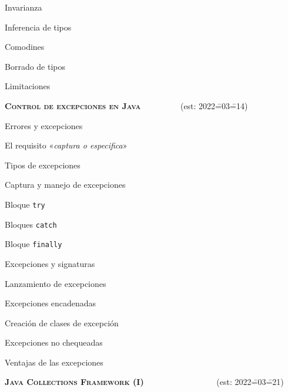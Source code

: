 \begin{longenum}
\begin{longenum}
\begin{longenum}
\begin{longenum}
                \item Invarianza
            \end{longenum}
        \end{longenum}
        \item Inferencia de tipos
        \item Comodines
        \item Borrado de tipos
        \item Limitaciones
    \end{longenum}
    \item \textbf{\textsc{Control de excepciones en Java}} \ \ \ \ \ \ \ \ \ (est: 2022\==03\==14)
    \begin{longenum}
        \item Errores y excepciones
        \item El requisito «\textit{captura o especifica}»
        \begin{longenum}
            \item Tipos de excepciones
        \end{longenum}
        \item Captura y manejo de excepciones
        \begin{longenum}
            \item Bloque \texttt{try}
            \item Bloques \texttt{catch}
            \item Bloque \texttt{finally}
        \end{longenum}
        \item Excepciones y signaturas
        \item Lanzamiento de excepciones
        \begin{longenum}
            \item Excepciones encadenadas
            \item Creación de clases de excepción
        \end{longenum}
        \item Excepciones no chequeadas
        \item Ventajas de las excepciones
    \end{longenum}
    \item \textbf{\textsc{Java Collections Framework (I)}} \ \ \ \ \ \ \ \ \ \ \ \ \ \ \ \ \ (est: 2022\==03\==21)
    \begin{longenum}

\end{longenum}
\end{longenum}
